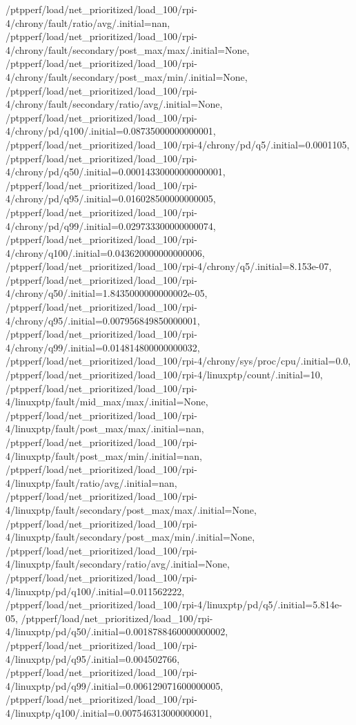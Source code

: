 {    /ptpperf/load/net_prioritized/load_100/rpi-4/chrony/fault/ratio/avg/.initial=nan,
    /ptpperf/load/net_prioritized/load_100/rpi-4/chrony/fault/secondary/post_max/max/.initial=None,
    /ptpperf/load/net_prioritized/load_100/rpi-4/chrony/fault/secondary/post_max/min/.initial=None,
    /ptpperf/load/net_prioritized/load_100/rpi-4/chrony/fault/secondary/ratio/avg/.initial=None,
    /ptpperf/load/net_prioritized/load_100/rpi-4/chrony/pd/q100/.initial=0.08735000000000001,
    /ptpperf/load/net_prioritized/load_100/rpi-4/chrony/pd/q5/.initial=0.0001105,
    /ptpperf/load/net_prioritized/load_100/rpi-4/chrony/pd/q50/.initial=0.00014330000000000001,
    /ptpperf/load/net_prioritized/load_100/rpi-4/chrony/pd/q95/.initial=0.016028500000000005,
    /ptpperf/load/net_prioritized/load_100/rpi-4/chrony/pd/q99/.initial=0.029733300000000074,
    /ptpperf/load/net_prioritized/load_100/rpi-4/chrony/q100/.initial=0.043620000000000006,
    /ptpperf/load/net_prioritized/load_100/rpi-4/chrony/q5/.initial=8.153e-07,
    /ptpperf/load/net_prioritized/load_100/rpi-4/chrony/q50/.initial=1.8435000000000002e-05,
    /ptpperf/load/net_prioritized/load_100/rpi-4/chrony/q95/.initial=0.007956849850000001,
    /ptpperf/load/net_prioritized/load_100/rpi-4/chrony/q99/.initial=0.014814800000000032,
    /ptpperf/load/net_prioritized/load_100/rpi-4/chrony/sys/proc/cpu/.initial=0.0,
    /ptpperf/load/net_prioritized/load_100/rpi-4/linuxptp/count/.initial=10,
    /ptpperf/load/net_prioritized/load_100/rpi-4/linuxptp/fault/mid_max/max/.initial=None,
    /ptpperf/load/net_prioritized/load_100/rpi-4/linuxptp/fault/post_max/max/.initial=nan,
    /ptpperf/load/net_prioritized/load_100/rpi-4/linuxptp/fault/post_max/min/.initial=nan,
    /ptpperf/load/net_prioritized/load_100/rpi-4/linuxptp/fault/ratio/avg/.initial=nan,
    /ptpperf/load/net_prioritized/load_100/rpi-4/linuxptp/fault/secondary/post_max/max/.initial=None,
    /ptpperf/load/net_prioritized/load_100/rpi-4/linuxptp/fault/secondary/post_max/min/.initial=None,
    /ptpperf/load/net_prioritized/load_100/rpi-4/linuxptp/fault/secondary/ratio/avg/.initial=None,
    /ptpperf/load/net_prioritized/load_100/rpi-4/linuxptp/pd/q100/.initial=0.011562222,
    /ptpperf/load/net_prioritized/load_100/rpi-4/linuxptp/pd/q5/.initial=5.814e-05,
    /ptpperf/load/net_prioritized/load_100/rpi-4/linuxptp/pd/q50/.initial=0.0018788460000000002,
    /ptpperf/load/net_prioritized/load_100/rpi-4/linuxptp/pd/q95/.initial=0.004502766,
    /ptpperf/load/net_prioritized/load_100/rpi-4/linuxptp/pd/q99/.initial=0.006129071600000005,
    /ptpperf/load/net_prioritized/load_100/rpi-4/linuxptp/q100/.initial=0.007546313000000001,
}
